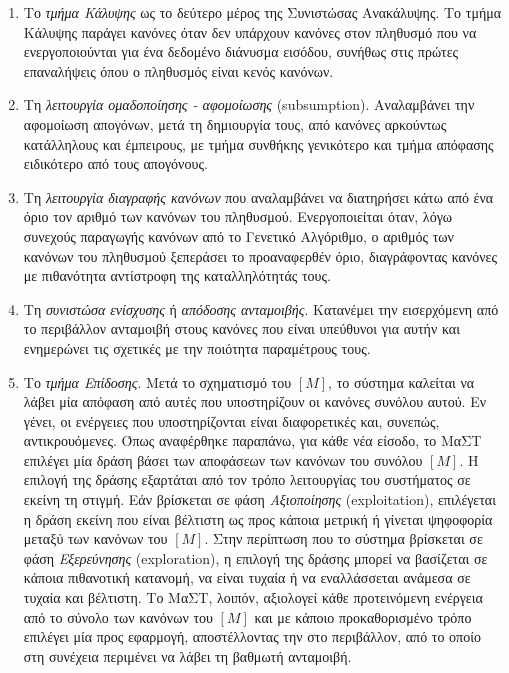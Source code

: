 \begin{enumerate}
\item Το \emph{τμήμα Κάλυψης} ως το δεύτερο μέρος της Συνιστώσας Ανακάλυψης. Το τμήμα Κάλυψης παράγει κανόνες όταν δεν υπάρχουν κανόνες στον πληθυσμό που να ενεργοποιούνται για ένα δεδομένο διάνυσμα εισόδου, συνήθως στις πρώτες επαναλήψεις όπου ο πληθυσμός είναι κενός κανόνων.

\item Τη \emph{λειτουργία ομαδοποίησης - αφομοίωσης} (subsumption). Αναλαμβάνει την αφομοίωση απογόνων, μετά τη δημιουργία τους, από κανόνες αρκούντως κατάλληλους και έμπειρους, με τμήμα συνθήκης γενικότερο και τμήμα απόφασης ειδικότερο από τους απογόνους.

\item Τη \emph{λειτουργία διαγραφής κανόνων} που αναλαμβάνει να διατηρήσει κάτω από ένα όριο τον αριθμό των κανόνων του πληθυσμού. Ενεργοποιείται όταν, λόγω συνεχούς παραγωγής κανόνων από το Γενετικό Αλγόριθμο, ο αριθμός των κανόνων του πληθυσμού ξεπεράσει το προαναφερθέν όριο, διαγράφοντας κανόνες με πιθανότητα αντίστροφη της καταλληλότητάς τους.

\item Τη \emph{συνιστώσα ενίσχυσης} ή \emph{απόδοσης ανταμοιβής}. Κατανέμει την εισερχόμενη από το περιβάλλον ανταμοιβή στους κανόνες που είναι υπεύθυνοι για αυτήν και ενημερώνει τις σχετικές με την ποιότητα παραμέτρους τους.

\item Το \emph{τμήμα Επίδοσης}. Μετά το σχηματισμό του $[M]$, το σύστημα καλείται να λάβει μία απόφαση από αυτές που υποστηρίζουν οι κανόνες συνόλου αυτού. Εν γένει, οι ενέργειες που υποστηρίζονται είναι διαφορετικές και, συνεπώς, αντικρουόμενες. Όπως αναφέρθηκε παραπάνω, για κάθε νέα είσοδο, το ΜαΣΤ επιλέγει μία δράση βάσει των αποφάσεων των κανόνων του συνόλου $[M]$. Η επιλογή της δράσης εξαρτάται από τον τρόπο λειτουργίας του συστήματος σε εκείνη τη στιγμή. Εάν βρίσκεται σε φάση \emph{Αξιοποίησης} (exploitation), επιλέγεται η δράση εκείνη που είναι βέλτιστη ως προς κάποια μετρική ή γίνεται ψηφοφορία μεταξύ των κανόνων του $[M]$. Στην περίπτωση που το σύστημα βρίσκεται σε φάση \emph{Εξερεύνησης} (exploration), η επιλογή της δράσης μπορεί να βασίζεται σε κάποια πιθανοτική κατανομή, να είναι τυχαία ή να εναλλάσσεται ανάμεσα σε τυχαία και βέλτιστη. Το ΜαΣΤ, λοιπόν, αξιολογεί κάθε προτεινόμενη ενέργεια από το σύνολο των κανόνων του $[M]$ και με κάποιο προκαθορισμένο τρόπο επιλέγει μία προς εφαρμογή, αποστέλλοντας την στο περιβάλλον, από το οποίο στη συνέχεια περιμένει να λάβει τη βαθμωτή ανταμοιβή.
\end{enumerate}


